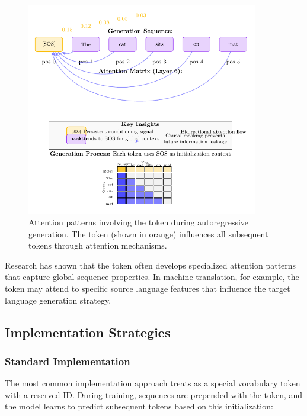 \begin{figure}[htbp]
\centering
\includegraphics[width=0.9\textwidth]{part1/chapter03/fig_sos_attention.pdf}
\caption{Attention patterns involving the \sos{} token during autoregressive generation. The \sos{} token (shown in orange) influences all subsequent tokens through attention mechanisms.}
\label{fig:sos_attention}
\end{figure}

Research has shown that the \sos{} token often develops specialized attention patterns that capture global sequence properties. In machine translation, for example, the \sos{} token may attend to specific source language features that influence the target language generation strategy.

\subsection{Implementation Strategies}

\subsubsection{Standard Implementation}

The most common implementation approach treats \sos{} as a special vocabulary token with a reserved ID. During training, sequences are prepended with the \sos{} token, and the model learns to predict subsequent tokens based on this initialization:


